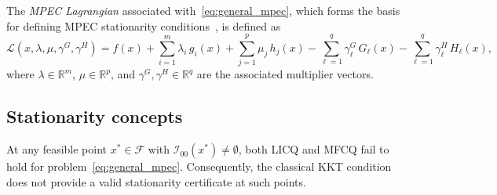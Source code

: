 The \emph{MPEC Lagrangian} associated with~\eqref{eq:general_mpec}, which forms
the basis for defining MPEC stationarity conditions~\citep{ScheelScholtes2000,FletcherLeyfferRalphScholtes2006}, is defined as
\begin{equation}
  \mathcal{L}(x, \lambda, \mu, \gamma^G, \gamma^H)
    = f(x) + \sum_{i=1}^{m} \lambda_i \, g_i(x)
      + \sum_{j=1}^{p} \mu_j \, h_j(x)
      - \sum_{\ell=1}^{q} \gamma^G_\ell \, G_\ell(x)
      - \sum_{\ell=1}^{q} \gamma^H_\ell \, H_\ell(x),
  \label{eq:mpec_lagrangian}
\end{equation}
where $\lambda \in \mathbb{R}^m$, $\mu \in \mathbb{R}^p$, and
$\gamma^G, \gamma^H \in \mathbb{R}^q$ are the associated multiplier
vectors.


\subsection{Stationarity concepts}
\label{sec:stationarity}

\begin{proposition}
\label{prop:cq_failure}
At any feasible point $x^* \in \mathcal{F}$ with $\mathcal{I}_{00}(x^*)
\neq \emptyset$, both LICQ and MFCQ fail to hold for
problem~\eqref{eq:general_mpec}. Consequently, the classical KKT condition
does not provide a valid stationarity certificate at such points.
\end{proposition}



